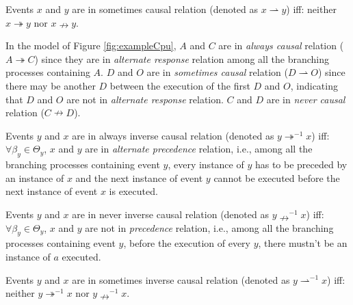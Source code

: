 \documentclass{llncs}
\begin{document}
\begin{definition}\label{def:sometimesCausal}
Events $x$ and $y$ are in sometimes causal relation (denoted as $x\rightharpoonup y$) iff: neither $x\twoheadrightarrow y$ nor $x\nrightarrow y$.
\end{definition}

\begin{example}\label{ex:causalRelation}
In the model of Figure \ref{fig:exampleCpu}, $A$ and $C$ are in \textit{always causal} relation ($A\twoheadrightarrow C$) since they are in \textit{alternate response} relation among all the branching processes containing $A$. $D$ and $O$ are in \textit{sometimes causal} relation ($D\rightharpoonup O$) since there may be another $D$ between the execution of the first $D$ and $O$, indicating that $D$ and $O$ are not in \textit{alternate response} relation. $C$ and $D$ are in \textit{never causal} relation ($C\nrightarrow D$).
\end{example}

\begin{definition}\label{def:alwaysInverseCausal}
Events $y$ and $x$ are in always inverse causal relation (denoted as $y\twoheadrightarrow^{-1}x$) iff: $\forall\beta_{y}\in\Theta_{y}$, $x$ and $y$ are in \textit{alternate precedence} relation, i.e., among all the branching processes containing event $y$, every instance of $y$ has to be preceded by an instance of $x$ and the next instance of event $y$ cannot be executed before the next instance of event $x$ is executed.
\end{definition}

\begin{definition}\label{def:neverInverseCausal}
Events $y$ and $x$ are in never inverse causal relation (denoted as $y\nrightarrow^{-1}x$) iff: $\forall\beta_{y}\in\Theta_{y}$, $x$ and $y$ are not in \textit{precedence} relation, i.e., among all the branching processes containing event $y$, before the execution of every $y$, there mustn't be an instance of $a$ executed.
\end{definition}

\begin{definition}\label{def:sometimesInverseCausal}
Events $y$ and $x$ are in sometimes inverse causal relation (denoted as $y\rightharpoonup^{-1}x$) iff: neither $y\twoheadrightarrow^{-1}x$ nor $y\nrightarrow^{-1}x$.
\end{definition}
\end{document}
